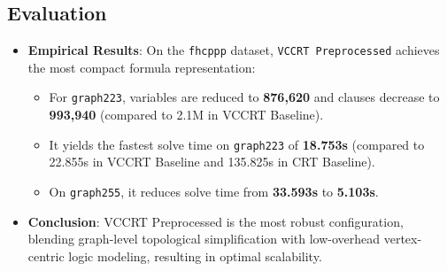 \subsection{Evaluation}
\begin{itemize}
    \item \textbf{Empirical Results}: On the \texttt{fhcppp} dataset, \texttt{VCCRT Preprocessed} achieves the most compact formula representation:
    \begin{itemize}
        \item For \texttt{graph223}, variables are reduced to \textbf{876,620} and clauses decrease to \textbf{993,940} (compared to 2.1M in VCCRT Baseline).
        \item It yields the fastest solve time on \texttt{graph223} of \textbf{18.753s} (compared to 22.855s in VCCRT Baseline and 135.825s in CRT Baseline).
        \item On \texttt{graph255}, it reduces solve time from \textbf{33.593s} to \textbf{5.103s}.
    \end{itemize}
    \item \textbf{Conclusion}: VCCRT Preprocessed is the most robust configuration, blending graph-level topological simplification with low-overhead vertex-centric logic modeling, resulting in optimal scalability.
\end{itemize}
